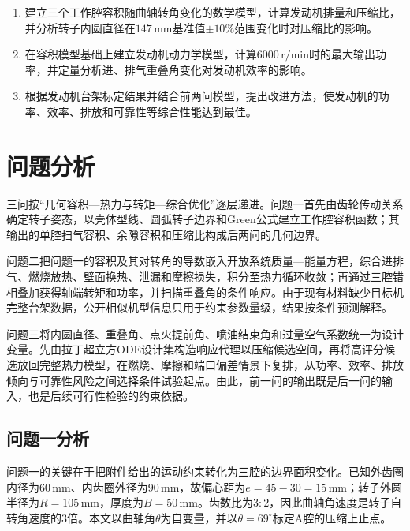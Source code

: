 \documentclass[withoutpreface,bwprint]{cumcmthesis}
\begin{document}
\begin{enumerate}[label=\textbf{问题\arabic*:},leftmargin=4.8em,labelsep=0.6em]
 \item 建立三个工作腔容积随曲轴转角变化的数学模型，计算发动机排量和压缩比，并分析转子内圆直径在$147\,\mathrm{mm}$基准值$\pm10\%$范围变化时对压缩比的影响。
 \item 在容积模型基础上建立发动机动力学模型，计算$6000\,\mathrm{r/min}$时的最大输出功率，并定量分析进、排气重叠角变化对发动机效率的影响。
 \item 根据发动机台架标定结果并结合前两问模型，提出改进方法，使发动机的功率、效率、排放和可靠性等综合性能达到最佳。
\end{enumerate}

\section{问题分析}
三问按“几何容积—热力与转矩—综合优化”逐层递进。问题一首先由齿轮传动关系确定转子姿态，以壳体型线、圆弧转子边界和Green公式建立工作腔容积函数；其输出的单腔扫气容积、余隙容积和压缩比构成后两问的几何边界。

问题二把问题一的容积及其对转角的导数嵌入开放系统质量—能量方程，综合进排气、燃烧放热、壁面换热、泄漏和摩擦损失，积分至热力循环收敛；再通过三腔错相叠加获得轴端转矩和功率，并扫描重叠角的条件响应。由于现有材料缺少目标机完整台架数据，公开相似机型信息只用于约束参数量级，结果按条件预测解释。

问题三将内圆直径、重叠角、点火提前角、喷油结束角和过量空气系数统一为设计变量。先由拉丁超立方ODE设计集构造响应代理以压缩候选空间，再将高评分候选放回完整热力模型，在燃烧、摩擦和端口偏差情景下复排，从功率、效率、排放倾向与可靠性风险之间选择条件试验起点。由此，前一问的输出既是后一问的输入，也是后续可行性检验的约束依据。

\subsection{问题一分析}
问题一的关键在于把附件给出的运动约束转化为三腔的边界面积变化。已知外齿圈内径为$60\,\mathrm{mm}$、内齿圈外径为$90\,\mathrm{mm}$，故偏心距为$e=45-30=15\,\mathrm{mm}$；转子外圆半径为$R=105\,\mathrm{mm}$，厚度为$B=50\,\mathrm{mm}$。齿数比为$3:2$，因此曲轴角速度是转子自转角速度的3倍。本文以曲轴角$\theta$为自变量，并以$\theta=69^\circ$标定A腔的压缩上止点。
\end{document}
